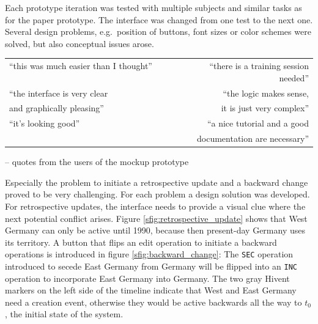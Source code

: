 Each prototype iteration was tested with multiple subjects and similar tasks as for the paper prototype. The interface was changed from one test to the next one. Several design problems, e.g.\ position of buttons, font sizes or color schemes were solved, but also conceptual issues arose.

\begin{quoteit}
  \begin{tabular}{l r}
    ``this was much easier than I thought'' ~~~~~~~~ &
    ``there is a training session needed'' \\[0.5em]
    ``the interface is very clear &
    ``the logic makes sense, \\
    and graphically pleasing'' &
    it is just very complex'' \\[0.5em]
    ``it's looking good'' &
    ``a nice tutorial and a good \\
    & documentation are necessary'' \\
  \end{tabular}
\end{quoteit}
\vspace{-1em}
\hfill -- quotes from the users of the mockup prototype

Especially the problem to initiate a retrospective update and a backward change proved to be very challenging. For each problem a design solution was developed. For retrospective updates, the interface needs to provide a visual clue where the next potential conflict arises. Figure \ref{sfig:retrospective_update} shows that West Germany can only be active until 1990, because then present-day Germany uses its territory. A button that flips an edit operation to initiate a backward operations is introduced in figure \ref{sfig:backward_change}: The \texttt{SEC} operation introduced to secede East Germany from Germany will be flipped into an \texttt{INC} operation to incorporate East Germany into Germany. The two gray Hivent markers on the left side of the timeline indicate that West and East Germany need a creation event, otherwise they would be active backwards all the way to $t_0$, the initial state of the system.

